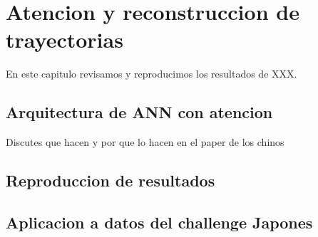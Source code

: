 \chapter{Atencion y reconstruccion de trayectorias}\label{chapter:proposal}

En este capitulo revisamos y reproducimos los resultados de XXX.

\section{Arquitectura de ANN con atencion}

Discutes que hacen y por que lo hacen en el paper de los chinos

\section{Reproduccion de resultados}

\section{Aplicacion a datos del challenge Japones}